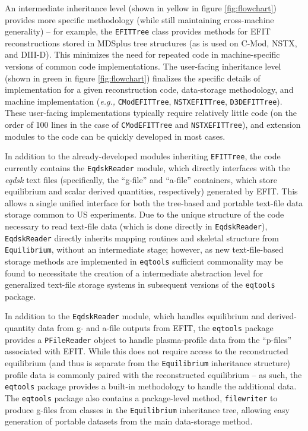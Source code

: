\documentclass[12pt,floatfix,showpacs]{revtex4-1}
\newcommand{\eg}{\emph{e.g., }}
\newcommand{\gnote}[1]{\marginpar{\scriptsize\textcolor{red}{#1}}}
\newcommand{\eqtools}{\texttt{eqtools}\xspace}
\begin{document}
An intermediate inheritance level (shown in yellow in figure \ref{fig:flowchart}) provides more specific methodology (while still maintaining cross-machine generality) -- for example, the \verb|EFITTree| class provides methods for EFIT reconstructions stored in MDSplus tree structures (as is used on C-Mod, NSTX, and DIII-D\gnote{cites?}).  
This minimizes the need for repeated code in machine-specific versions of common code implementations.  
The user-facing inheritance level (shown in green in figure \ref{fig:flowchart}) finalizes the specific details of implementation for a given reconstruction code, data-storage methodology, and machine implementation (\eg \verb|CModEFITTree|, \verb|NSTXEFITTree|, \verb|D3DEFITTree|).  
These user-facing implementations typically require relatively little code (on the order of 100 lines in the case of \verb|CModEFITTree| and \verb|NSTXEFITTree|), and extension modules to the code can be quickly developed in most cases.

In addition to the already-developed modules inheriting \verb|EFITTree|, the code currently contains the \verb|EqdskReader| module, which directly interfaces with the \emph{eqdsk} text files (specifically, the ``g-file'' and ``a-file'' containers, which store equilibrium and scalar derived quantities, respectively) generated by EFIT.\gnote{cite?}  
This allows a single unified interface for both the tree-based and portable text-file data storage common to US experiments.\gnote{expand?  other countries?}  
Due to the unique structure of the code necessary to read text-file data (which is done directly in \verb|EqdskReader|), \verb|EqdskReader| directly inherits mapping routines and skeletal structure from \verb|Equilibrium|, without an intermediate stage; however, as new text-file-based storage methods are implemented in \eqtools sufficient commonality may be found to necessitate the creation of a intermediate abstraction level for generalized text-file storage systems in subsequent versions of the \eqtools package.

In addition to the \verb|EqdskReader| module, which handles equilibrium and derived-quantity data from g- and a-file outputs from EFIT, the \eqtools package provides a \verb|PFileReader| object to handle plasma-profile data from the ``p-files'' associated with EFIT.  
While this does not require access to the reconstructed equilibrium (and thus is separate from the \verb|Equilibrium| inheritance structure) profile data is commonly paired with the reconstructed equilibrium -- as such, the \eqtools package provides a built-in methodology to handle the additional data.  
The \eqtools package also contains a package-level method, \verb|filewriter|\gnote{check naming!} to produce g-files from classes in the \verb|Equilibrium| inheritance tree, allowing easy generation of portable datasets from the main data-storage method.\gnote{reword?}
\end{document}
